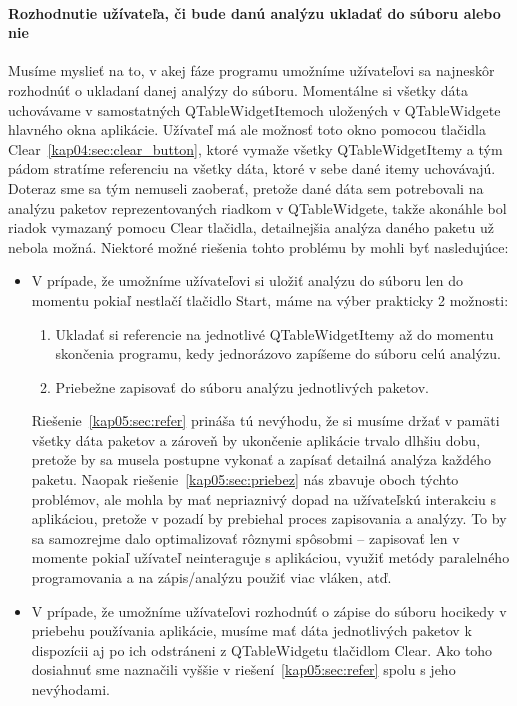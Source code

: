 \paragraph{Rozhodnutie užívateľa, či bude danú analýzu ukladať do súboru alebo nie}
\hfill \break
Musíme myslieť na to, v akej fáze programu umožníme užívateľovi sa najneskôr rozhodnúť o ukladaní danej analýzy do súboru. Momentálne si všetky dáta uchovávame v samostatných QTableWidgetItemoch uložených v QTableWidgete hlavného okna aplikácie. Užívateľ má ale možnosť toto okno  pomocou tlačidla Clear~\ref{kap04:sec:clear_button}, ktoré vymaže všetky QTableWidgetItemy a tým pádom stratíme referenciu na všetky dáta, ktoré v sebe dané itemy uchovávajú. Doteraz sme sa tým nemuseli zaoberať, pretože dané dáta sem potrebovali na analýzu paketov reprezentovaných riadkom v QTableWidgete, takže akonáhle bol riadok vymazaný pomocu Clear tlačidla, detailnejšia analýza daného paketu už nebola možná. Niektoré možné riešenia tohto problému by mohli byť nasledujúce:
\begin{itemize}
\item V prípade, že umožníme užívateľovi si uložiť analýzu do súboru len do momentu pokiaľ nestlačí tlačidlo Start, máme na výber prakticky 2 možnosti:
\begin{enumerate}
\item \label{kap05:sec:refer} Ukladať si referencie na jednotlivé QTableWidgetItemy až do momentu skončenia programu, kedy jednorázovo zapíšeme do súboru celú analýzu.
\item \label{kap05:sec:priebez} Priebežne zapisovať do súboru analýzu jednotlivých paketov.
\end{enumerate}
Riešenie~\ref{kap05:sec:refer} prináša tú nevýhodu, že si musíme držať v pamäti všetky dáta paketov a zároveň by ukončenie aplikácie trvalo dlhšiu dobu, pretože by sa musela postupne vykonať a zapísať detailná analýza každého paketu. Naopak riešenie~\ref{kap05:sec:priebez} nás zbavuje oboch týchto problémov, ale mohla by mať nepriaznivý dopad na užívateľskú interakciu s aplikáciou, pretože v pozadí by prebiehal proces zapisovania a analýzy. To by sa samozrejme dalo optimalizovať rôznymi spôsobmi -- zapisovať len v momente pokiaľ užívateľ neinteraguje s aplikáciou, využiť metódy paralelného programovania a na zápis/analýzu použiť viac vláken, atď.

\item V prípade, že umožníme užívateľovi rozhodnúť o zápise do súboru hocikedy v priebehu používania aplikácie, musíme mať dáta jednotlivých paketov k dispozícii aj po ich odstráneni z QTableWidgetu tlačidlom Clear. Ako toho dosiahnuť sme naznačili vyššie v riešení~\ref{kap05:sec:refer} spolu s jeho nevýhodami.
\end{itemize}

